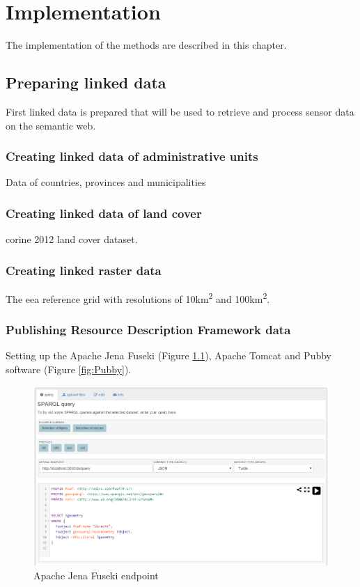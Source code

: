 
\chapter{Implementation}
\label{chap:impl}

The implementation of the methods are described in this chapter.

\section{Preparing linked data}
First linked data is prepared that will be used to retrieve and process sensor data on the semantic web.

\subsection{Creating linked data of administrative units}
Data of countries, provinces and municipalities

\subsection{Creating linked data of land cover}
\ac{corine} 2012 land cover dataset. 

\subsection{Creating linked raster data}
The \ac{eea} reference grid with resolutions of 10km\textsuperscript{2} and 100km\textsuperscript{2}.

\subsection{Publishing Resource Description Framework data}
Setting up the Apache Jena Fuseki (Figure \ref{fig:Fuseki}), Apache Tomcat and Pubby software (Figure \ref{fig:Pubby}\textbf{}).

\begin{figure}
	\includegraphics[width=\linewidth]{figs/fuseki.PNG}
	\caption{Apache Jena Fuseki endpoint}
	\label{fig:Fuseki}
\end{figure}

